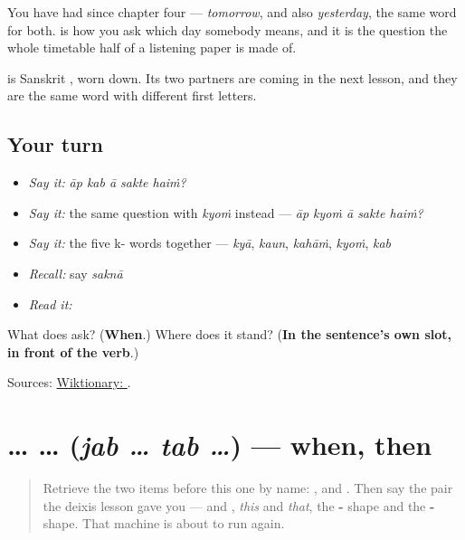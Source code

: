 You have had \textbf{} since chapter four — \emph{tomorrow}, and also \emph{yesterday}, the same word for both. \textbf{} is how you ask which day somebody means, and it is the question the whole timetable half of a listening paper is made of.

\textbf{} is Sanskrit \textbf{}, worn down. Its two partners are coming in the next lesson, and they are the same word with different first letters.

\subsection*{Your turn}
\begin{itemize}
\raggedright
  \item \emph{Say it:} \emph{āp kab ā sakte haiṁ?}
  \item \emph{Say it:} the same question with \emph{kyoṁ} instead — \emph{āp kyoṁ ā sakte haiṁ?}
  \item \emph{Say it:} the five k- words together — \emph{kyā}, \emph{kaun}, \emph{kahāṁ}, \emph{kyoṁ}, \emph{kab}
  \item \emph{Recall:} say \emph{saknā}
  \item \emph{Read it:} \textbf{}
\end{itemize}

\begin{tcolorbox}[breakable,colback=teal!4,colframe=teal!35!black,title={Before you move on}]
What does \textbf{} ask? (\textbf{When}.) Where does it stand? (\textbf{In the sentence's own slot, in front of the verb}.)

Sources: \href{https://en.wiktionary.org/wiki/\%E0\%A4\%95\%E0\%A4\%AC}{Wiktionary: }.
\end{tcolorbox}
\section[\texorpdfstring{\hi{जब} … \hi{तब} … (jab … tab …)}{जब … तब … (jab … tab …)}]{ …  … (\emph{jab … tab …}) — when, then}

\label{lesson:HI-C72-jab-tab}



\begin{quote}
Retrieve the two items before this one by name: \textbf{}, and \textbf{}. Then say the pair the deixis lesson gave you — \textbf{} and \textbf{}, \emph{this} and \emph{that}, the \textbf{-} shape and the \textbf{-} shape. That machine is about to run again.
\end{quote}

